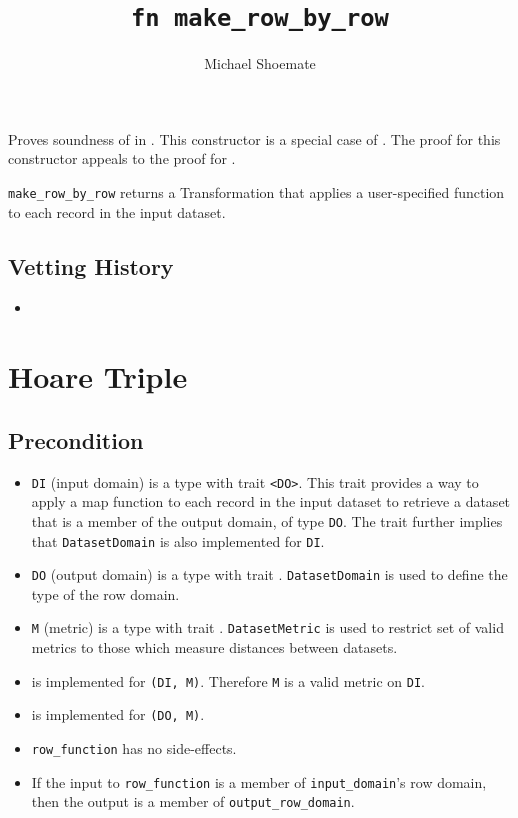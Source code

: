 \documentclass{article}
\title{\texttt{fn make\_row\_by\_row}}
\author{Michael Shoemate}
\date{}
\begin{document}
\maketitle

\contrib
Proves soundness of  in .
This constructor is a special case of .
The proof for this constructor appeals to the proof for .

\texttt{make\_row\_by\_row} returns a Transformation that applies a user-specified function to each record in the input dataset.

\subsection*{Vetting History}
\begin{itemize}
    \item {}
\end{itemize}

\section{Hoare Triple}
\subsection*{Precondition}
\begin{itemize}

    \item \texttt{DI} (input domain) is a type with trait \texttt{<DO>}. 
        This trait provides a way to apply a map function to each record in the input dataset to retrieve a dataset that is a member of the output domain, of type \texttt{DO}. The trait further implies that \texttt{DatasetDomain} is also implemented for \texttt{DI}.
    \item \texttt{DO} (output domain) is a type with trait . 
        \texttt{DatasetDomain} is used to define the type of the row domain.
    \item \texttt{M} (metric) is a type with trait . 
        \texttt{DatasetMetric} is used to restrict set of valid metrics to those which measure distances between datasets.
    \item {} is implemented for \texttt{(DI, M)}. Therefore \texttt{M} is a valid metric on \texttt{DI}.
    \item {} is implemented for \texttt{(DO, M)}.
    \item \texttt{row\_function} has no side-effects.
    \item If the input to \texttt{row\_function} is a member of \texttt{input\_domain}'s row domain, then the output is a member of \texttt{output\_row\_domain}.
\end{itemize}
\end{document}
